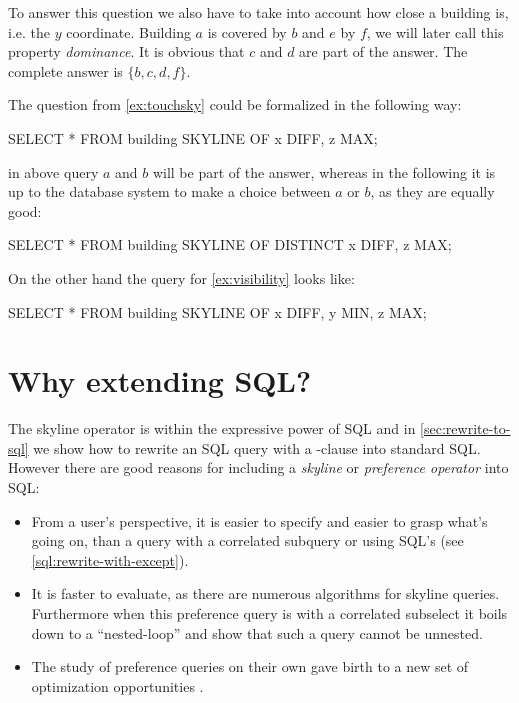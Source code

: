 \begin{example}\label{ex:visibility}
To answer this question we also have to take into account how close a
building is, i.e. the $y$ coordinate.  Building $a$ is covered by $b$
and $e$ by $f$, we will later call this property \emph{dominance}. It
is obvious that $c$ and $d$ are part of the answer. The complete
answer is $\{b, c, d, f\}$.
\end{example}

\noindent
The question from \autoref{ex:touchsky} could be formalized in the
following way:

\begin{interactive}
SELECT * FROM building SKYLINE OF x DIFF, z MAX;
\end{interactive}

\noindent
in above query $a$ and $b$ will be part of the answer, whereas in the following
it is up to the database system to make a choice between $a$ or $b$, as they 
are equally good:

\begin{interactive}
SELECT * FROM building SKYLINE OF DISTINCT x DIFF, z MAX;
\end{interactive}

\noindent
On the other hand the query for \autoref{ex:visibility} looks like:

\begin{interactive}
SELECT * FROM building SKYLINE OF x DIFF, y MIN, z MAX;
\end{interactive}

\section{Why extending SQL?}
The skyline operator is within the expressive power of SQL and in
\autoref{sec:rewrite-to-sql} we show how to rewrite an SQL query with
a -clause into standard SQL. 
However there are good reasons for including a \emph{skyline} or 
\emph{preference operator} into SQL:

\begin{itemize}
\item 
From a user's perspective, it is easier to specify and easier to grasp
what's going on, than a query with a correlated subquery or using
SQL's  (see \autoref{sql:rewrite-with-except}).

\item
It is faster to evaluate, as there are numerous algorithms for skyline
queries. Furthermore when this preference query is with a correlated
subselect it boils down to a \naive ``nested-loop'' and
\citet{Grust1997, Braumandl1998} show that such a query cannot be
unnested.

\item
The study of preference queries on their own gave birth to a new set
of optimization opportunities \citep{Chomicki2003a, Kiessling2003}.
\end{itemize}

